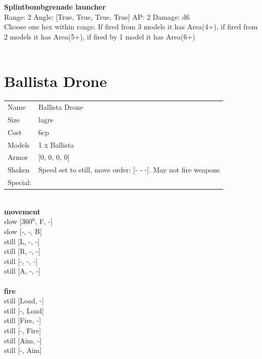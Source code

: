 \ \\

\ \\
{\bf Splintbombgrenade launcher } \\



Range: 2  Angle: [True, True, True, True] AP: 2 Damage: d6 \\
Choose one hex within range. If fired from 3 models it has Area(4+), if fired from 2 models it has Area(5+), if fired by 1 model it has Area(6+)\\ 




 
\ \\













\clearpage

\section{ Ballista Drone }

\begin{tabular}{ll}
  Name & Ballista Drone \\
  Size & lagre\\
  Cost & 6cp\\
  Models & 1 x Ballista\\
  Armor & [0, 0, 0, 0]\\
  Shaken & Speed set to still, move order: [- - -]. May not fire weapons\\
  Special: \\
\end{tabular}

\noindent 

\ \\ {\bf movement } \\
slow [360$^0$, F, -] \\
slow [-, -, B] \\
still [L, -, -] \\
still [R, -, -] \\
still [-, -, -] \\
still [A, -, -] \\
\ \\ {\bf fire } \\
still [Load, -] \\
still [-, Load] \\
still [Fire, -] \\
still [-, Fire] \\
still [Aim, -] \\
still [-, Aim] \\


